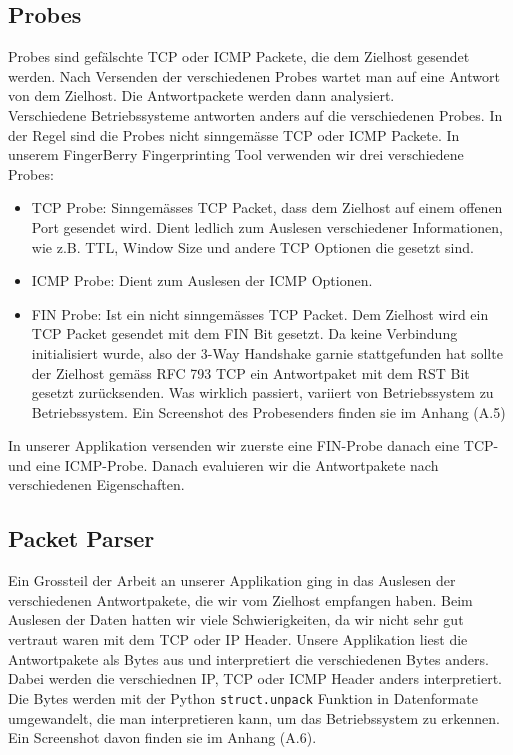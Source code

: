 \documentclass{article} %
\begin{document}
\subsection{Probes}
Probes sind gef\"alschte TCP oder ICMP Packete, die dem Zielhost gesendet werden. Nach Versenden der verschiedenen Probes wartet man auf eine Antwort von dem Zielhost. Die Antwortpackete werden dann analysiert.\\
Verschiedene Betriebssysteme antworten anders auf die verschiedenen Probes. In der Regel sind die Probes nicht sinngem\"asse TCP oder ICMP Packete. In unserem FingerBerry Fingerprinting Tool verwenden wir drei verschiedene Probes: 
\begin{itemize}
	\item TCP Probe: Sinngem\"asses TCP Packet, dass dem Zielhost auf einem offenen Port gesendet wird. Dient ledlich zum Auslesen verschiedener Informationen, wie z.B. TTL, Window Size und andere TCP Optionen die gesetzt sind.
	\item ICMP Probe: Dient zum Auslesen der ICMP Optionen.
	\item FIN Probe: Ist ein nicht sinngem\"asses TCP Packet. Dem Zielhost wird ein TCP Packet gesendet mit dem FIN Bit gesetzt. Da keine Verbindung initialisiert wurde, also der 3-Way Handshake garnie stattgefunden hat sollte der Zielhost gem\"ass RFC 793 TCP ein Antwortpaket mit dem RST Bit gesetzt zur\"ucksenden. Was wirklich passiert, variiert von Betriebssystem zu Betriebssystem. Ein Screenshot des Probesenders finden sie im Anhang (A.5)
\end{itemize}
In unserer Applikation versenden wir zuerste eine FIN-Probe danach eine TCP- und eine ICMP-Probe. Danach evaluieren wir die Antwortpakete nach verschiedenen Eigenschaften.



\subsection{Packet Parser}
Ein Grossteil der Arbeit an unserer Applikation ging in das Auslesen der verschiedenen Antwortpakete, die wir vom Zielhost empfangen haben. Beim Auslesen der Daten hatten wir viele Schwierigkeiten, da wir nicht sehr gut vertraut waren mit dem TCP oder IP Header. Unsere Applikation liest die Antwortpakete als Bytes aus und interpretiert die verschiedenen Bytes anders. Dabei werden die verschiednen IP, TCP oder ICMP Header anders interpretiert. Die Bytes werden mit der Python \texttt{struct.unpack} Funktion in Datenformate umgewandelt, die man interpretieren kann, um das Betriebssystem zu erkennen. Ein Screenshot davon finden sie im Anhang (A.6).
\end{document}
